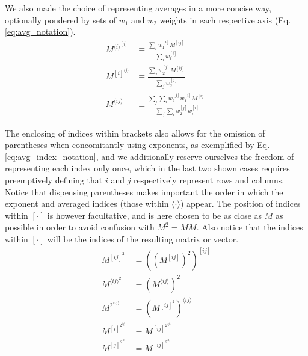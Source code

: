 \documentclass[conference]{IEEEtran}
\newcommand{\el}[1]{^{[#1]}}
\newcommand{\mel}[1]{^{\langle #1 \rangle}}
\begin{document}
We also made the choice of representing averages in a more concise way,
optionally pondered by sets of $w_1$ and $w_2$ weights in each respective axis
(Eq. \ref{eq:avg_notation}).
%
\begin{equation}
    \begin{split}
        M\mel i \el j
            &\equiv \frac{\sum_i w_1\el i M\el{ij}} {\sum_i w_1\el i}\\
        M\el i \mel j
            &\equiv \frac{\sum_j w_2\el j M\el{ij}} {\sum_j w_2\el j}\\
        M\mel{ij}
            &\equiv \frac{\sum_j \sum_i w_2\el j w_1\el i M\el{ij}} {\sum_j \sum_i w_2\el j w_i\el i}
    \end{split}
    \label{eq:avg_notation}
\end{equation}

The enclosing of indices within brackets also allows for the omission of
parentheses when concomitantly using exponents, as exemplified by Eq.
\ref{eq:avg_index_notation}, and we additionally reserve ourselves the freedom
of representing each index only once, which in the last two shown cases requires
preemptively defining that $i$ and $j$ respectively represent rows and columns.
Notice that dispensing parentheses makes important the order in which the
exponent and averaged indices (those within $\langle \cdot \rangle$) appear. The
position of indices within $[\cdot]$ is however facultative, and is here chosen
to be as close as $M$ as possible in order to avoid confusion with $M^2=MM$.
Also notice that the indices within $[\cdot]$ will be the indices of the
resulting matrix or vector.
%
\begin{equation}
    \begin{split}
        M \el {ij} ^2 &= ((M \el{ij})^2)\el{ij}\\
        M \mel {ij} ^2 &= (M \mel{ij})^2\\
        M ^2 \mel {ij} &= (M \el{ij}^2)\mel{ij}\\
        M \el i ^2 \mel j &= M \el{ij}^2\mel j\\
        M \el j ^2 \mel i &= M \el{ij}^2\mel i\\
    \end{split}
    \label{eq:avg_index_notation}
\end{equation}
\end{document}
